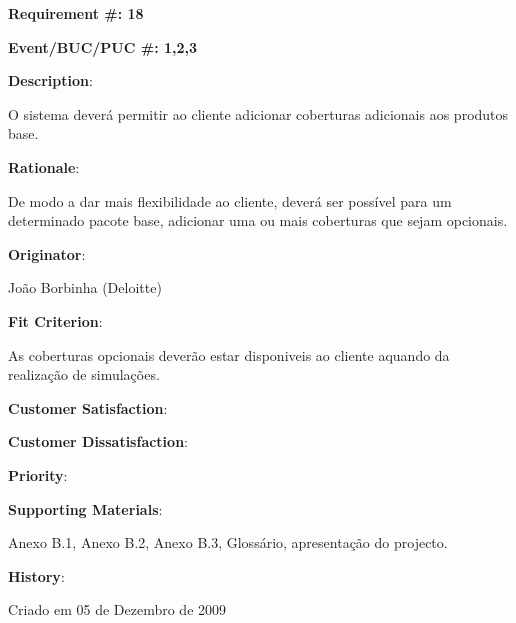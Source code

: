 \pagebreak

\begin{minipage}{0.55\textwidth}
\begin{flushleft}\textbf{Requirement \#: 18}\end{flushleft}
\end{minipage}
\begin{minipage}{0.4\textwidth}
\begin{flushright}\textbf{Event/BUC/PUC \#: 1,2,3}\end{flushright}
\end{minipage}

\begin{description}

\item \textbf{Description}:

O sistema deverá permitir ao cliente adicionar coberturas adicionais aos produtos base.\\

\item \textbf{Rationale}:

De modo a dar mais flexibilidade ao cliente, deverá ser possível para um determinado pacote base, adicionar uma ou mais coberturas que sejam opcionais.\\

\item \textbf{Originator}:

João Borbinha (Deloitte)\\

\item \textbf{Fit Criterion}:

As coberturas opcionais deverão estar disponiveis ao cliente aquando da realização de simulações.\\

\begin{minipage}{0.45\textwidth}
\begin{flushleft}\item \textbf{Customer Satisfaction}:\end{flushleft}
\end{minipage}
\begin{minipage}{0.45\textwidth}
\begin{flushleft}\item \textbf{Customer Dissatisfaction}:\end{flushleft}
\end{minipage}

\item \textbf{Priority}:\\

\item \textbf{Supporting Materials}:

Anexo B.1, Anexo B.2, Anexo B.3, Glossário, apresentação do projecto.\\

\item \textbf{History}:

Criado em 05 de Dezembro de 2009\\
\end{description}

